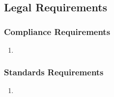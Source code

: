 
\subsection{Legal Requirements}
\label{sub:legal_requirements}

\subsubsection{Compliance Requirements}
\label{ssub:compliance_requirements}
\begin{enumerate}[{LR-COMP}1. ]
	\item 
\end{enumerate}

\subsubsection{Standards Requirements}
\label{ssub:standards_requirements}
\begin{enumerate}[{LR-STD}1. ]
	\item 
\end{enumerate}


